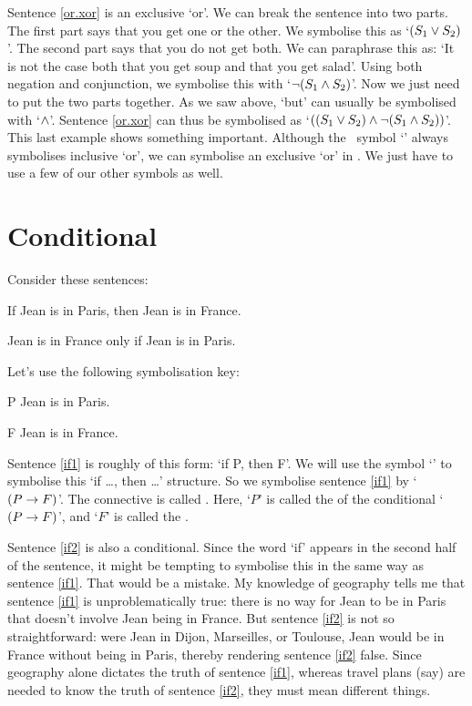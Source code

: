 Sentence \ref{or.xor} is an exclusive `or'. We can break the sentence into two parts. The first part says that you get one or the other. We symbolise this as `$(S_1 \vee S_2)$'. The second part says that you do not get both. We can paraphrase this as: `It is not the case both that you get soup and that you get salad'. Using both negation and conjunction, we symbolise this with `$\neg(S_1 \wedge S_2)$'. Now we just need to put the two parts together. As we saw above, `but' can usually be symbolised with `$\wedge$'. Sentence \ref{or.xor} can thus be symbolised as `$((S_1 \vee S_2) \wedge \neg(S_1 \wedge S_2))$'. This last example shows something important. Although the \TFL\ symbol `\eor' always symbolises inclusive `or', we can symbolise an exclusive `or' in \TFL. We just have to use a few of our other symbols as well.


\section{Conditional}
Consider these sentences:
	\begin{earg}
		\item[\ex{if1}] If Jean is in Paris, then Jean is in France.
		\item[\ex{if2}] Jean is in France only if Jean is in Paris.
	\end{earg}
Let's use the following symbolisation key:
	\begin{ekey}
		\item[P] Jean is in Paris.
		\item[F] Jean is in France.
	\end{ekey}
Sentence \ref{if1} is roughly of this form: `if P, then F'. We will use the symbol `\eif' to symbolise this `if …, then …' structure. So we symbolise sentence \ref{if1} by `$(P\rightarrow F)$'. The connective is called . Here, `$P$' is called the  of the conditional `$(P \rightarrow F)$', and `$F$' is called the .

Sentence \ref{if2} is also a conditional. Since the word `if' appears in the second half of the sentence, it might be tempting to symbolise this in the same way as sentence \ref{if1}. That would be a mistake. My knowledge of geography tells me that sentence \ref{if1} is unproblematically true: there is no way for Jean to be in Paris that doesn't involve Jean being in France. But sentence \ref{if2} is not so straightforward: were  Jean in Dijon, Marseilles, or Toulouse, Jean would be in France without being in Paris, thereby rendering sentence \ref{if2} false. Since geography alone dictates the truth of sentence \ref{if1}, whereas travel plans (say) are needed to know the truth of sentence \ref{if2}, they must mean different things.

